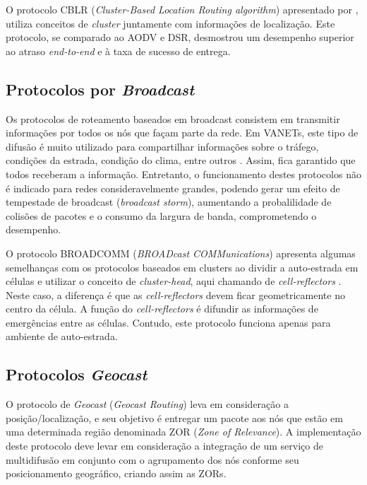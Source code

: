 \documentclass[
	12pt,				%
	oneside,			%
	a4paper,			%
	english,			%
	brazil				%
	]{abntex2ppgsi}
\begin{document}
O protocolo CBLR (\textit{Cluster-Based Location Routing algorithm}) apresentado por  , utiliza conceitos de \textit{cluster} juntamente com informações de localização. Este protocolo, se comparado ao AODV e DSR, desmostrou um desempenho superior ao atraso \textit{end-to-end} e à taxa de sucesso de entrega.


\subsection{Protocolos  por \textit{Broadcast}}

Os protocolos de roteamento baseados em broadcast consistem em transmitir informações por todos os nós que façam parte da rede. Em VANETs, este tipo de difusão é muito utilizado para compartilhar informações sobre o tráfego, condições da estrada, condição do clima, entre outros \cite{luis2009melhoria}. Assim,  fica garantido que todos receberam a informação. Entretanto, o funcionamento destes protocolos não é indicado para redes consideravelmente grandes, podendo gerar um efeito de tempestade de broadcast (\textit{broadcast storm}), aumentando a probalilidade de colisões de pacotes e o consumo da largura de banda, comprometendo o desempenho.

O protocolo BROADCOMM (\textit{BROADcast COMMunications}) apresenta algumas semelhanças com os protocolos baseados em clusters ao dividir a auto-estrada em células e utilizar o conceito de \textit{cluster-head}, aqui chamando de \textit{cell-reflectors} \cite{durresi2005emergency}. Neste caso, a diferença é que as \textit{cell-reflectors} devem ficar geometricamente no centro da célula. A função do \textit{cell-reflectors} é difundir as informações de emergências entre as células. Contudo, este protocolo funciona apenas para ambiente de auto-estrada.  

\subsection{Protocolos \textit{Geocast}}

O protocolo de \textit{Geocast} (\textit{Geocast Routing}) leva em consideração a posição/localização, e seu objetivo é entregar um pacote aos nós que estão em uma determinada região denominada ZOR (\textit{Zone of Relevance}). A implementação deste protocolo deve levar em consideração a integração de um serviço de multidifusão em conjunto com o agrupamento dos nós conforme seu posicionamento geográfico, criando assim as ZORs.
\end{document}
